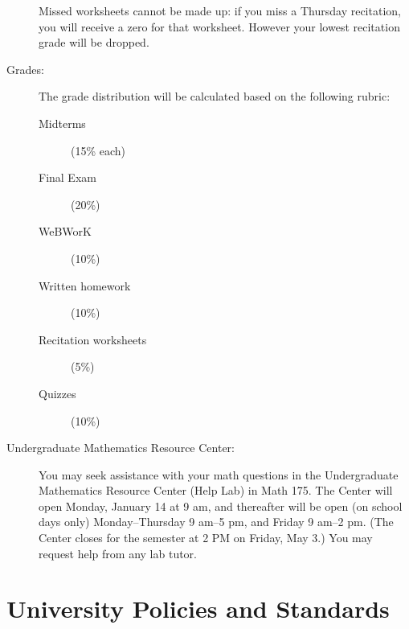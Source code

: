 \documentclass[11pt]{article}
\begin{document}
\begin{description}
  Missed worksheets cannot be made up: if you miss a Thursday
  recitation, you will receive a zero for that worksheet. However your
  lowest recitation grade will be dropped.

\item[Grades:] The grade distribution will be calculated based on the
  following rubric:
  \begin{description}
  \item[Midterms] (15\% each)
  \item[Final Exam] (20\%)
  \item[WeBWorK] (10\%)
  \item[Written homework] (10\%)
  \item[Recitation worksheets] (5\%)  
  \item[Quizzes] (10\%)
  \end{description}

\item[Undergraduate Mathematics Resource Center:] You may seek
  assistance with your math questions in the Undergraduate Mathematics
  Resource Center (Help Lab) in Math 175.  The Center will open
  Monday, January 14 at 9 am, and thereafter will be open (on school
  days only) Monday--Thursday 9 am--5 pm, and Friday 9 am--2 pm.  (The
  Center closes for the semester at 2 PM on Friday, May 3.) You may
  request help from any lab tutor.
\end{description}

\section*{University Policies and Standards}
\end{document}
